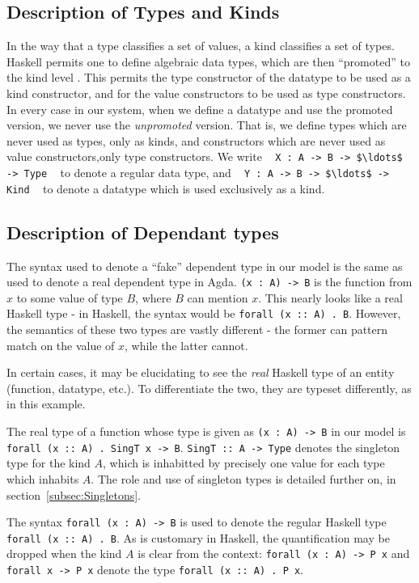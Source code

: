 \noindent
\subsection{Description of Types and Kinds}
In the way that a type classifies a set of values, a kind classifies a set of
types. Haskell permits one to define algebraic data types, which are then 
``promoted''
to the kind level \citep{promotion}. 
This permits the type constructor of the datatype to be used
as a kind constructor, and for the value constructors to be used as type 
constructors. In every case in our system, when we define a datatype and use 
the promoted version, we never use the \emph{unpromoted} version. That is, we 
define types which are never used as types, only as kinds, and constructors 
which are never used as value constructors,only type constructors. We write 
\,\,\,
\lstinline!X : A -> B -> $\ldots$ -> Type!
\,\,\, 
to denote a regular data type, and 
\,\,\,
\lstinline!Y : A -> B -> $\ldots$ -> Kind!
\,\,\, 
to denote a datatype
which is used exclusively as a kind. 

\noindent
\subsection{Description of Dependant types}
The syntax used to denote a ``fake'' dependent type in our model is the same 
as used to denote a real dependent type in Agda. \lstinline!(x : A) -> B! is 
the function
from $x$ to some value of type $B$, where $B$ can mention $x$. This nearly 
looks like a 
real Haskell type - in Haskell, the syntax would be \texttt{forall (x :: A) . 
B}. However, 
the semantics of these two types are vastly different - the former can pattern 
match
on the value of $x$, while the latter cannot. 

In certain cases, it may be elucidating to see the \emph{real} Haskell type of
an entity (function, datatype, etc.). To differentiate the two, they are typeset
differently, as in this example.

The real type of a function whose type is given as \lstinline!(x : A) -> B! in
our model is \texttt{forall (x :: A) . SingT x -> B}. \texttt{SingT :: A -> 
Type}
denotes the singleton type for the kind $A$, which is inhabitted by precisely
one value for each type which inhabits $A$. The role and use of singleton types
is detailed further on, in section~\ref{subsec:Singletons}. 

The syntax \lstinline!forall (x : A) -> B! is used to denote the regular
Haskell type \texttt{forall (x :: A) . B}. As is customary in Haskell, the 
quantification
may be dropped when the kind $A$ is clear from the context: 
\lstinline!forall (x : A) -> P x! 
and
\lstinline!forall x -> P x! denote the type \texttt{forall (x :: A) . P x}.

